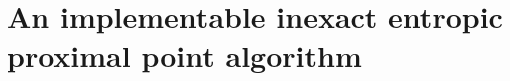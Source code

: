 \documentclass[10pt]{article}
\newcommand{\cA}{{\cal A}}
\newcommand{\R}{\mathbb R}
\begin{document}














\section{An implementable inexact entropic proximal point algorithm}\label{secEPPA}
\end{document}
